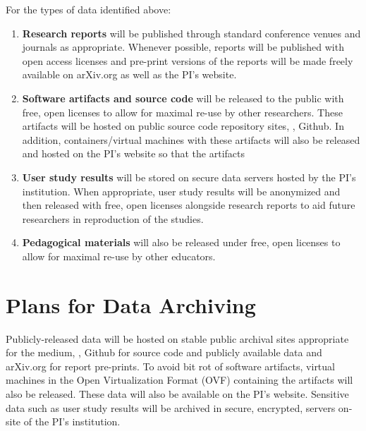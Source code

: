 \documentclass[11pt]{article}
\begin{document}
For the types of data identified above:
\begin{enumerate}
  \item \textbf{Research reports} will be published through standard conference venues and journals as appropriate.
    Whenever possible, reports will be published with open access licenses and pre-print versions of the reports will be made freely available on arXiv.org as well as the PI's website.
  \item \textbf{Software artifacts and source code} will be released to the public with free, open licenses to allow for maximal re-use by other researchers.
    These artifacts will be hosted on public source code repository sites, \eg, Github.
    In addition, containers/virtual machines with these artifacts will also be released and hosted on the PI's website so that the artifacts
  \item \textbf{User study results} will be stored on secure data servers hosted by the PI's institution.
    When appropriate, user study results will be anonymized and then released with free, open licenses alongside research reports to aid future researchers in reproduction of the studies.
  \item \textbf{Pedagogical materials} will also be released under free, open licenses to allow for maximal re-use by other educators.
\end{enumerate}

\section*{Plans for Data Archiving}

Publicly-released data will be hosted on stable public archival sites appropriate for the medium, \eg, Github for source code and publicly available data and arXiv.org for report pre-prints.  To avoid bit rot of software artifacts, virtual machines in the Open Virtualization Format (OVF) containing the artifacts will also be released.
These data will also be available on the PI's website.
Sensitive data such as user study results will be archived in secure, encrypted, servers on-site of the PI's institution.
\end{document}
